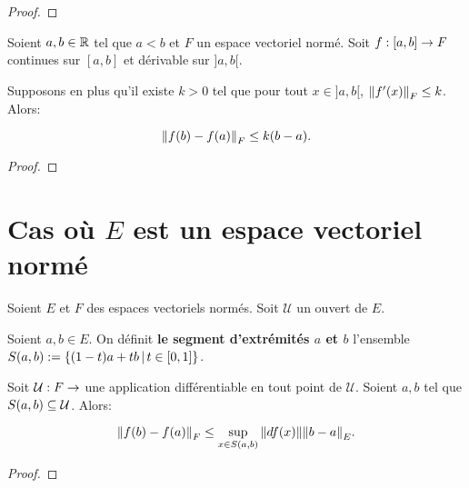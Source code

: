\ifdefined\outputproof
\begin{proof}

\end{proof}
\fi

\begin{corollary}
	Soient $a, b \in \mathbb{R}$ tel que $a < b$ et $F$ un espace vectoriel normé.
	Soit $f : [a, b] \rightarrow F$ continues sur $[a, b]$ et dérivable sur
	$]a, b[$.

	Supposons en plus qu'il existe $k > 0$ tel que pour tout $x \in ]a, b[$,
	$\norm{f'(x)}_{F} \leq k$. Alors:

	\begin{equation*}
		\norm{f(b) - f(a)}_{F} \leq k (b - a).
	\end{equation*}
\end{corollary}

\ifdefined\outputproof
\begin{proof}

\end{proof}
\fi

\section{Cas où $E$ est un espace vectoriel normé}

Soient $E$ et $F$ des espaces vectoriels normés.
Soit $\mathcal{U}$ un ouvert de $E$.

\begin{definition}
	Soient $a, b \in E$. On définit \textbf{le segment d'extrémités $a$ et $b$}
	l'ensemble $S(a, b) := \left\{(1 - t) a + t b \, | \, t \in [0, 1] \right\}$.
\end{definition}

\begin{theorem}
	Soit $\GSfunction{\mathcal{U}}{F}$ une application différentiable en tout
	point de $\mathcal{U}$.
	Soient $a, b$ tel que $S(a, b) \subseteq \mathcal{U}$.
	Alors:

	\begin{equation*}
		\norm{f(b) - f(a)}_{F} \leq \displaystyle \sup_{x \in S(a, b)}
		\norm{df(x)} \norm{b - a}_{E}.
	\end{equation*}

	\label{theorem:mean_value_theorem}
\end{theorem}

\ifdefined\outputproof
\begin{proof}

\end{proof}
\fi

